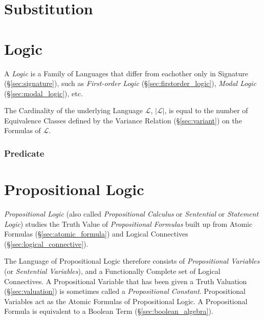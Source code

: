 \section{Substitution}\label{sec:substitution}



\section{Logic}\label{sec:logic}

A \emph{Logic} is a Family of Languages that differ from eachother
only in Signature (\S\ref{sec:signature}), such as \emph{First-order
  Logic} (\S\ref{sec:firstorder_logic}), \emph{Modal Logic}
(\S\ref{sec:modal_logic}), etc.

The Cardinality of the underlying Language $\mathcal{L}$,
$|\mathcal{L}|$, is equal to the number of Equivalence Classes defined
by the Variance Relation (\S\ref{sec:variant}) on the Formulas of
$\mathcal{L}$.



\subsubsection{Predicate}\label{sec:predicate}



\section{Propositional Logic}\label{sec:propositional_logic}

\emph{Propositional Logic} (also called \emph{Propositional Calculus}
or \emph{Sentential} or \emph{Statement Logic}) studies the Truth
Value of \emph{Propositional Formulas} built up from Atomic Formulas
(\S\ref{sec:atomic_formula}) and Logical Connectives
(\S\ref{sec:logical_connective}).

The Language of Propositional Logic therefore consists of
\emph{Propositional Variables} (or \emph{Sentential Variables}), and a
Functionally Complete set of Logical Connectives. A Propositional
Variable that has been given a Truth Valuation (\S\ref{sec:valuation})
is sometimes called a \emph{Propositional Constant}. Propositional
Variables act as the Atomic Formulas of Propositional Logic. A
Propositional Formula is equivalent to a Boolean Term
(\S\ref{sec:boolean_algebra}).

